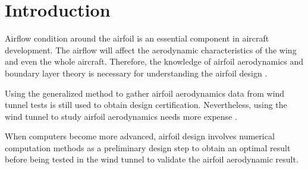\section{Introduction}

Airflow condition around the airfoil is an essential component in aircraft development. The airflow will affect the aerodynamic characteristics of the wing and even the whole aircraft. Therefore, the knowledge of airfoil aerodynamics and boundary layer theory is necessary for understanding the airfoil design \cite{eppler2012airfoil}.

Using the generalized method to gather airfoil aerodynamics data from wind tunnel tests is still used to obtain design certification. Nevertheless, using the wind tunnel to study airfoil aerodynamics needs more expense \cite{blocken2016pedestrian}.

When computers become more advanced, airfoil design involves numerical computation methods as a preliminary design step \cite{li2006transonic} to obtain an optimal result before being tested in the wind tunnel to validate the airfoil aerodynamic result.
